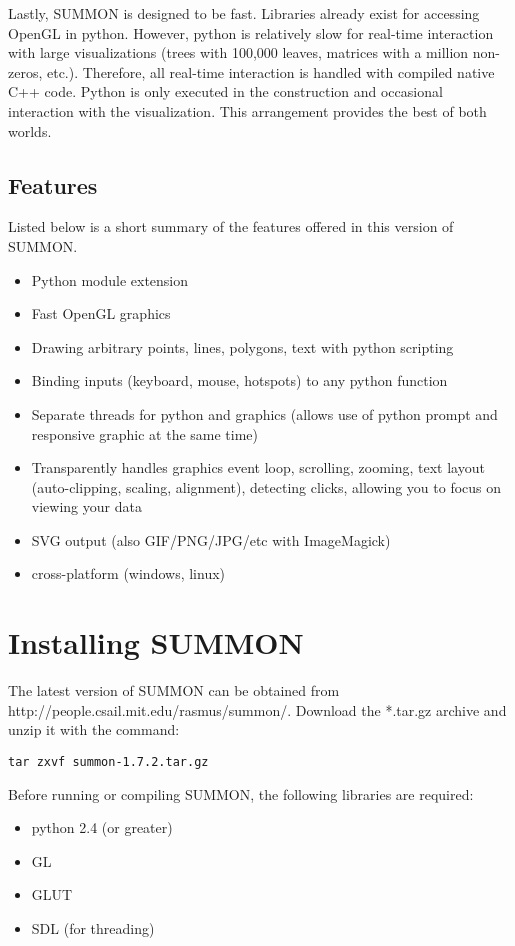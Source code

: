 \documentclass[12pt]{article}
\newcommand{\items}[1]{\begin{itemize} #1 \end{itemize}}
\newcommand{\codeblock}[1]{\vspace{.1in} {\tt #1} \vspace{.1in}}
\newcommand{\version}{1.7.2}
\begin{document}
Lastly, SUMMON is designed to be fast.  Libraries already exist for
accessing OpenGL in python.  However, python is relatively slow for real-time
interaction with large visualizations (trees with 100,000 leaves, matrices with
a million non-zeros, etc.).  Therefore, all real-time interaction is handled
with compiled native C++ code.  Python is only executed in the construction 
and occasional interaction with the visualization.  This arrangement provides 
the best of both worlds.




\subsection{Features}

Listed below is a short summary of the features offered in this version of
SUMMON.

\items{
    \item Python module extension
    \item Fast OpenGL graphics
    \item Drawing arbitrary points, lines, polygons, text with python scripting
    \item Binding inputs (keyboard, mouse, hotspots) to any python function 
    \item Separate threads for python and graphics (allows use of python prompt
          and responsive graphic at the same time)    
    \item Transparently handles graphics event loop, scrolling, zooming, text
          layout (auto-clipping, scaling, alignment), detecting clicks, allowing
          you to focus on viewing your data
    \item SVG output (also GIF/PNG/JPG/etc with ImageMagick)
    \item cross-platform (windows, linux)
}


\section{Installing SUMMON}
\label{sec:installing}

The latest version of SUMMON can be obtained from 
http://people.csail.mit.edu/rasmus/summon/.  Download the *.tar.gz archive and
unzip it with the command:

\codeblock{tar zxvf summon-\version.tar.gz}

Before running or compiling SUMMON, the following libraries are required:
\items {
    \item python 2.4 (or greater)
    \item GL   
    \item GLUT
    \item SDL (for threading)
}
\end{document}
